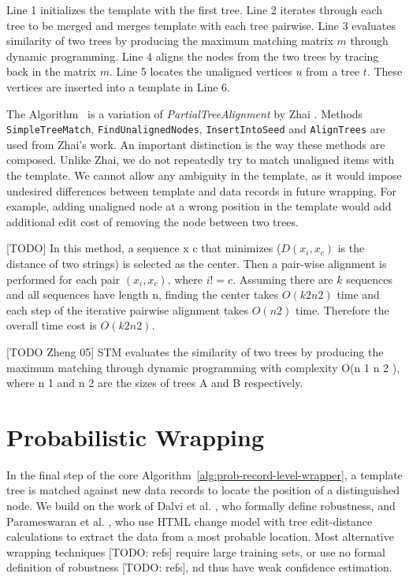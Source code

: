 Line 1 initializes the template with the first tree. Line 2 iterates through each tree to be merged and merges template with each tree pairwise. Line 3 evaluates similarity of two trees by producing the maximum matching matrix $m$ through dynamic programming. Line 4 aligns the nodes from the two trees by tracing back in the matrix $m$. Line 5 locates the unaligned vertices $u$ from a tree $t$. These vertices are inserted into a template in Line 6.

The Algorithm~\cite{alg:merging-data-records} is a variation of \emph{PartialTreeAlignment} by Zhai \cite{zhai2005a}. Methods \texttt{SimpleTreeMatch}, \texttt{FindUnalignedNodes}, \texttt{InsertIntoSeed} and \texttt{AlignTrees} are used from Zhai's work. An important distinction is the way these methods are composed. Unlike Zhai, we do not repeatedly try to match unaligned items with the template. We cannot allow any ambiguity in the template, as it would impose undesired differences between template and data records in future wrapping. For example, adding unaligned node at a wrong position in the template would add additional edit cost of removing the node between two trees.

[TODO]
In this method, a sequence x c that minimizes ($D(x_i, x_c)$ is the distance of two strings)
is selected as the center. Then a pair-wise alignment is performed
for each pair $(x_i, x_c)$, where $i != c$. Assuming there are $k$ sequences
and all sequences have length n, finding the center takes $O(k 2 n 2 )$
time and each step of the iterative pairwise alignment takes $O(n 2 )$
time. Therefore the overall time cost is $O(k 2 n 2 )$.

[TODO Zheng 05] STM evaluates the similarity of two trees by producing the maximum matching through dynamic programming with complexity O(n 1 n 2 ), where n 1 and n 2 are the sizes of trees A and B respectively.


\section{Probabilistic Wrapping}

In the final step of the core Algorithm~\ref{alg:prob-record-level-wrapper}, a template tree is matched against new data records to locate the position of a distinguished node. We build on the work of Dalvi et al. \cite{dalvi2009a}, who formally define robustness, and Parameswaran et al. \cite{DBLP:journals/pvldb/ParameswaranDGR11}, who use HTML change model with tree edit-distance calculations to extract the data from a most probable location. Most alternative wrapping techniques [TODO: refs] require large training sets, or use no formal definition of robustness [TODO: refs], 
nd thus have weak confidence estimation.

